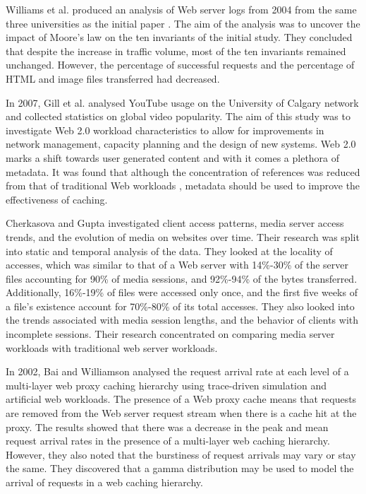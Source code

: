 \documentclass[10pt,conference]{IEEEtran}
\begin{document}
Williams et al. \cite{williams05} produced an analysis of Web server logs from 2004 from the same three universities as the initial paper \cite{keynote}. The aim of the analysis was to uncover the impact of Moore's law on the ten invariants of the initial study. They concluded that despite the increase in traffic volume, most of the ten invariants remained unchanged. However, the percentage of successful requests and the percentage of HTML and image files transferred had decreased. 

In 2007, Gill et al. \cite{youtube} analysed YouTube usage on the University of Calgary network and collected statistics on global video popularity. The aim of this study was to investigate Web 2.0 workload characteristics to allow for improvements in network management, capacity planning and the design of new systems. Web 2.0 marks a shift towards user generated content and with it comes a plethora of metadata. It was found that although the concentration of references was reduced from that of traditional Web workloads \cite{keynote}, metadata should be used to improve the effectiveness of caching.

Cherkasova and Gupta \cite{Cherkasova} investigated client access patterns, media server access trends, and the evolution of media on websites over time. Their research was split into static and temporal analysis of the data. They looked at the locality of accesses, which was similar to that of a Web server with 14\%-30\% of the server files accounting for 90\% of media sessions, and 92\%-94\% of the bytes transferred. Additionally, 16\%-19\% of files were accessed only once, and the first five weeks of a file’s existence account for 70\%-80\% of its total accesses. They also looked into the trends associated with media session lengths, and the behavior of clients with incomplete sessions. Their research concentrated on comparing media server workloads with traditional web server workloads.

In 2002, Bai and Williamson \cite{Bai} analysed the request arrival rate at each level of a multi-layer web proxy caching hierarchy using trace-driven simulation and artificial web workloads. The presence of a Web proxy cache means that requests are removed from the Web server request stream when there is a cache hit at the proxy. The results showed that there was a decrease in the peak and mean request arrival rates in the presence of a multi-layer web caching hierarchy. However, they also noted that the burstiness of request arrivals may vary or stay the same. They discovered that a gamma distribution may be used to model the arrival of requests in a web caching hierarchy.
\end{document}
